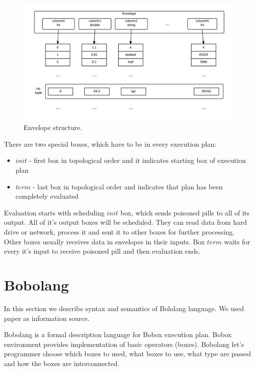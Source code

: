 \begin{figure}[h!]
  \centering
    \includegraphics[width=1\textwidth]{envelope}

      \caption{Envelope structure.}
          \label{fig:envelope}
\end{figure}
There are two special boxes, which have to be in every execution plan:
\begin{itemize}


\item $init$ - first box in topological order and it indicates starting box of execution plan

\item $term$ - last box in topological order and indicates that plan has been completely evaluated

\end{itemize}

Evaluation starts with scheduling $init$ box, which sends poisoned pills to all of its output. All of it's output boxes will be scheduled. They can read data from hard drive or network, process it and sent it to other boxes for further processing. Other boxes usually receives data in envelopes in their inputs. Box $term$ waits for every it's input to receive poisoned pill and then evaluation ends.

\section{Bobolang}
In this section we describe syntax and semantics of Bololang language. We used paper\cite{bobolang} as information source.

Bobolang is a formal description language for Bobox execution plan. Bobox environment provides implementation of basic operators (boxes). Bobolang let's programmer choose which boxes to used, what boxes to use, what type are passed and how the boxes are interconnected. 


